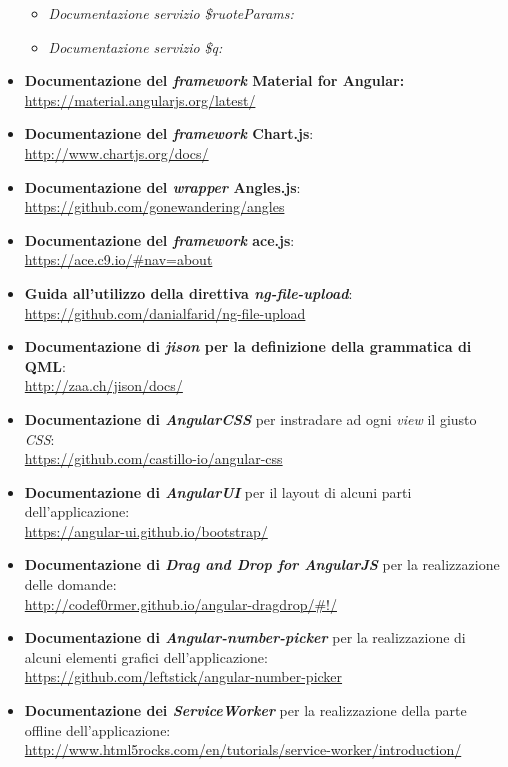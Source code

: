 \begin{itemize}
\begin{itemize}
			\item \textit{Documentazione servizio \$ruoteParams:} 
			\item \textit{Documentazione servizio \$q:} 
		\end{itemize}
	\item \textbf{Documentazione del \textit{framework} Material for Angular:} \\
		\url{https://material.angularjs.org/latest/}
	\item \textbf{Documentazione del \textit{framework} Chart.js}: \\
		\url{http://www.chartjs.org/docs/}
	\item \textbf{Documentazione del \textit{wrapper} Angles.js}: \\
		\url{https://github.com/gonewandering/angles}
	\item \textbf{Documentazione del \textit{framework} ace.js}: \\
		\url{https://ace.c9.io/#nav=about}
	\item \textbf{Guida all'utilizzo della direttiva \textit{ng-file-upload}}: \\
		\url{https://github.com/danialfarid/ng-file-upload}
	\item \textbf{Documentazione di \textit{jison} per la definizione della grammatica di QML}: \\
		\url{http://zaa.ch/jison/docs/}
	\item \textbf{Documentazione di \textit{AngularCSS}} per instradare ad ogni \textit{view} il giusto \textit{CSS}: \\
		\url{https://github.com/castillo-io/angular-css}
	\item \textbf{Documentazione di \textit{AngularUI}} per il layout di alcuni parti dell'applicazione: \\
		\url{https://angular-ui.github.io/bootstrap/}
	\item \textbf{Documentazione di \textit{Drag and Drop for AngularJS}} per la realizzazione delle domande: \\
		\url{http://codef0rmer.github.io/angular-dragdrop/#!/}
	\item \textbf{Documentazione di \textit{Angular-number-picker}} per la realizzazione di alcuni elementi grafici dell'applicazione: \\
		\url{https://github.com/leftstick/angular-number-picker}
	\item \textbf{Documentazione dei \textit{ServiceWorker}} per la realizzazione della parte offline dell'applicazione: \\
	\url{http://www.html5rocks.com/en/tutorials/service-worker/introduction/}
\end{itemize}